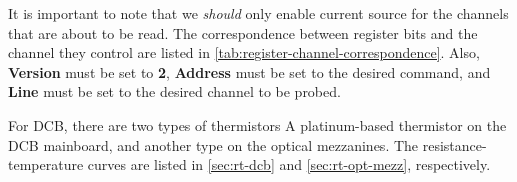 It is important to note that we \emph{should} only enable current source for the
channels that are about to be read.
The correspondence between register bits and the channel they control are listed
in \autoref{tab:register-channel-correspondence}.
Also, \textbf{Version} must be set to \textbf{2}, \textbf{Address} must be set
to the desired command, and \textbf{Line} must be set to the desired channel to
be probed.

For DCB, there are two types of thermistors A platinum-based thermistor on the
DCB mainboard, and another type on the optical mezzanines.
The resistance-temperature curves are listed in \autoref{sec:rt-dcb}
and \autoref{sec:rt-opt-mezz}, respectively.
